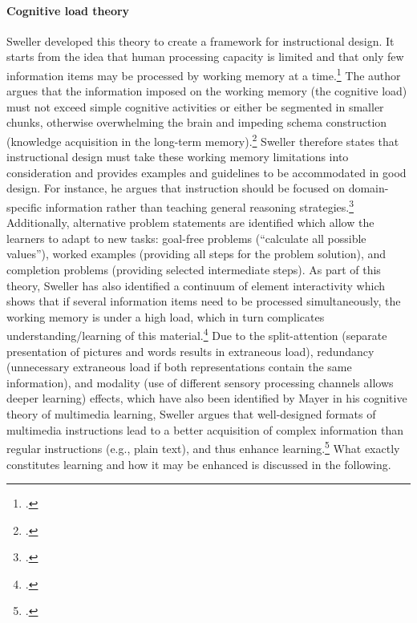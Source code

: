 \paragraph{Cognitive load theory} Sweller developed this theory to create a framework for instructional design. It starts from the idea that human processing capacity is limited and that only few information items may be processed by working memory at a time.\footcites[Cf.][p.250]{SwellerCognitiveArchitectureInstructional1998}[cf.][p.490]{Gervenefficiencymultimedialearning2003} The author argues that the information imposed on the working memory (the cognitive load) must not exceed simple cognitive activities or either be segmented in smaller chunks, otherwise overwhelming the brain and impeding schema construction (knowledge acquisition in the long-term memory).\footcites[Cf.][p.255 et seqq]{SwellerCognitiveArchitectureInstructional1998}[cf.][p.2]{SwellerVisualisationInstructionalDesign2002}[cf.][p.562]{Gervenefficiencymultimedialearning2003} Sweller therefore states that instructional design must take these working memory limitations into consideration and provides examples and guidelines to be accommodated in good design. For instance, he argues that instruction should be focused on domain-specific information rather than teaching general reasoning strategies.\footcites[Cf.][p.255]{SwellerCognitiveArchitectureInstructional1998}[cf.][p.301]{SwellerCognitiveloadtheory1994} Additionally, alternative problem statements are identified which allow the learners to adapt to new tasks: goal-free problems (\enquote{calculate all possible values}), worked examples (providing all steps for the problem solution), and completion problems (providing selected intermediate steps).
As part of this theory, Sweller has also identified a continuum of element interactivity which shows that if several information items need to be processed simultaneously, the working memory is under a high load, which in turn complicates understanding/learning of this material.\footcites[Cf.][p.261]{SwellerCognitiveArchitectureInstructional1998} Due to the split-attention (separate presentation of pictures and words results in extraneous load), redundancy (unnecessary extraneous load if both representations contain the same information), and modality (use of different sensory processing channels allows deeper learning) effects, which have also been identified by Mayer in his cognitive theory of multimedia learning, Sweller argues that well-designed formats of multimedia instructions lead to a better acquisition of complex information than regular instructions (e.g., plain text), and thus enhance learning.\footcites[Cf.][p.4]{PaasCognitiveLoadTheory2004} What exactly constitutes learning and how it may be enhanced is discussed in the following.

